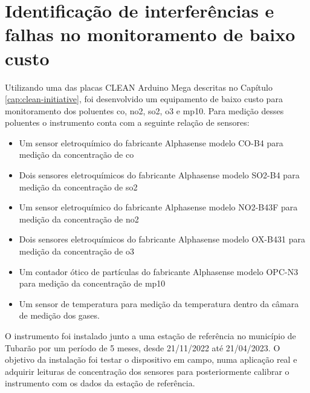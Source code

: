 \chapter{Identificação de interferências e falhas no monitoramento de baixo custo}\label{cap:field-monit-results}

Utilizando uma das placas CLEAN Arduino Mega descritas no Capítulo \ref{cap:clean-initiative}, foi desenvolvido um equipamento de baixo custo para monitoramento dos poluentes \acrshort{co}, \acrshort{no2}, \acrshort{so2}, \acrshort{o3} e \acrshort{mp10}. Para medição desses poluentes o instrumento conta com a seguinte relação de sensores:

\begin{itemize}
    \item Um sensor eletroquímico do fabricante Alphasense modelo CO-B4 para medição da concentração de \acrshort{co}
    \item Dois sensores eletroquímicos do fabricante Alphasense modelo SO2-B4 para medição da concentração de \acrshort{so2}\footnotemark[4]
    \item Um sensor eletroquímico do fabricante Alphasense modelo NO2-B43F para medição da concentração de \acrshort{no2}
    \item Dois sensores eletroquímicos do fabricante Alphasense modelo OX-B431 para medição da concentração de \acrshort{o3}
    \item Um contador ótico de partículas do fabricante Alphasense modelo OPC-N3 para medição da concentração de \acrshort{mp10}
    \item Um sensor de temperatura para medição da temperatura dentro da câmara de medição dos gases.
\end{itemize}

O instrumento foi instalado junto a uma estação de referência no município de Tubarão por um período de 5 meses, desde 21/11/2022 até 21/04/2023. O objetivo da instalação foi testar o dispositivo em campo, numa aplicação real e adquirir leituras de concentração dos sensores para posteriormente calibrar o instrumento com os dados da estação de referência.

